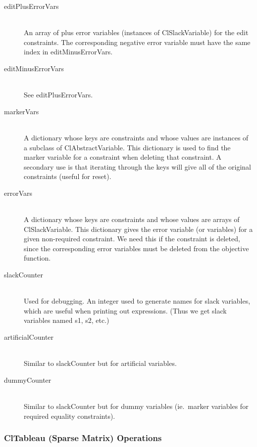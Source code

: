 \documentclass{article}
\begin{document}
\begin{description}
\item[{\sf editPlusErrorVars}] \ \\
An array of plus error variables (instances
of {\sf ClSlackVariable}) for the edit constraints.  The corresponding
negative error variable must have the same index in {\sf editMinusErrorVars}.

\item[{\sf editMinusErrorVars}] \ \\
See {\sf editPlusErrorVars}.

\item[{\sf markerVars}] \ \\
A dictionary whose keys are constraints and whose
values are instances of a subclass of {\sf ClAbstractVariable}.  This
dictionary is used to find the marker variable for a constraint when
deleting that constraint.  A secondary use is that iterating through the
keys will give all of the original constraints (useful for {\sf reset}).

\item[{\sf errorVars}] \ \\
A dictionary whose keys are constraints and whose
values are arrays of {\sf ClSlackVariable}.  This dictionary gives the
error variable (or variables) for a given non-required constraint.  We need
this if the constraint is deleted, since the corresponding error variables
must be deleted from the objective function.

\item[{\sf slackCounter}] \ \\
Used for debugging.  An integer used to generate
names for slack variables, which are useful when printing out expressions.
(Thus we get slack variables named {\sf s1}, {\sf s2}, etc.)

\item[{\sf artificialCounter}] \ \\
Similar to {\sf slackCounter} but for
artificial variables.

\item[{\sf dummyCounter}]  \ \\
Similar to {\sf slackCounter} but for
dummy variables (ie.\ marker variables for required equality constraints).

\end{description}

\subsubsection{{\sf ClTableau} (Sparse Matrix) Operations }
\label{cl-tableau-implementation}
\end{document}
